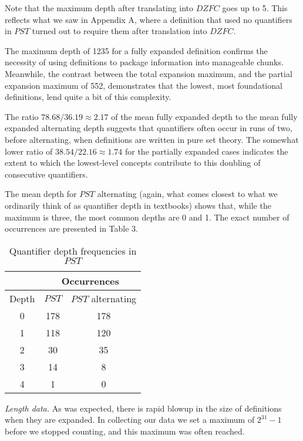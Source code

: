 \documentclass{llncs}
\newcommand{\na}[1]{\mathit{#1}}    \newcommand{\fn}[1]{\mathit{#1}}    \newcommand{\ax}[1]{\mathit{(#1)}}  \newcommand{\mdl}[1]{\mathcal{#1}}
\begin{document}
Note that the maximum depth after translating into $\na{DZFC}$ goes up
to 5. This reflects what we saw in Appendix A, where a definition that
used no quantifiers in $\na{PST}$ turned out to require them after
translation into $\na{DZFC}$.

The maximum depth of 1235 for a fully expanded definition confirms the
necessity of using definitions to package information into manageable
chunks. Meanwhile, the contrast between the total expansion maximum,
and the partial expansion maximum of 552, demonstrates that the
lowest, most foundational definitions, lend quite a bit of this
complexity.

The ratio $78.68/36.19 \approx 2.17$ of the mean fully expanded depth
to the mean fully expanded alternating depth suggests that quantifiers
often occur in runs of two, before alternating, when definitions are
written in pure set theory. The somewhat lower ratio of $38.54/22.16
\approx 1.74$ for the partially expanded cases indicates the extent to
which the lowest-level concepts contribute to this doubling of
consecutive quantifiers.

The mean depth for $\na{PST}$ alternating (again, what comes closest
to what we ordinarily think of as quantifier depth in textbooks) shows
that, while the maximum is three, the most common depths are 0 and
1. The exact number of occurrences are presented in Table 3.

\begin{table}
\label{PSTdepths}
\begin{center}
\caption{Quantifier depth frequencies in $\na{PST}$}
\begin{tabular}{|c|c|c|}
\hline
 & \multicolumn{2}{|c|}{Occurrences} \\\hline
Depth & $\na{PST}$ & $\na{PST}$ alternating \\\hline
0 & 178 & 178 \\
1 & 118 & 120 \\
2 & 30  & 35  \\
3 & 14  & 8   \\
4 & 1   & 0   \\
\hline
\end{tabular}
\end{center}
\end{table}

\noindent \emph{Length data.} As was expected, there is rapid blowup
in the size of definitions when they are expanded. In collecting our
data we set a maximum of $2^{31}-1$ before we stopped counting, and
this maximum was often reached.
\end{document}
